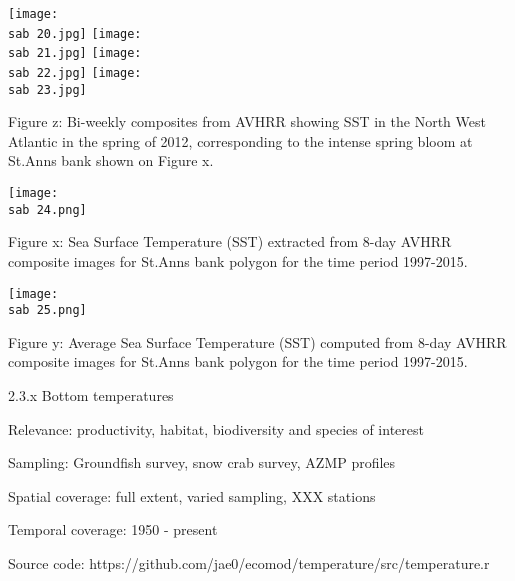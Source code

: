 \documentclass[letterpaper,portrait,12pt]{scrartcl}
\numberwithin{equation}{section}		%
\numberwithin{figure}{section}			%
\numberwithin{table}{section}				%
\newcommand{\sab}{\string~/ecomod_data/mpa/sab/}   %
\begin{document}
\texttt{[image: \\sab 20.jpg]}
\texttt{[image: \\sab 21.jpg]}
\texttt{[image: \\sab 22.jpg]}
\texttt{[image: \\sab 23.jpg]}





Figure z: Bi-weekly composites from AVHRR showing SST in the North West Atlantic in the spring of 2012, corresponding to the intense spring bloom at St.Anns bank shown on Figure x.









\texttt{[image: \\sab 24.png]}





Figure x: Sea Surface Temperature (SST) extracted from 8-day AVHRR composite images for St.Anns bank polygon for the time period 1997-2015.




 \texttt{[image: \\sab 25.png]}





Figure y: Average Sea Surface Temperature (SST) computed from 8-day AVHRR composite images for St.Anns bank polygon for the time period 1997-2015.














2.3.x  Bottom temperatures









Relevance:  productivity, habitat, biodiversity and species of interest




Sampling:  Groundfish survey, snow crab survey, AZMP profiles 




Spatial coverage: full extent, varied sampling, XXX stations




Temporal coverage: 1950 - present




Source code: https://github.com/jae0/ecomod/temperature/src/temperature.r
\end{document}
